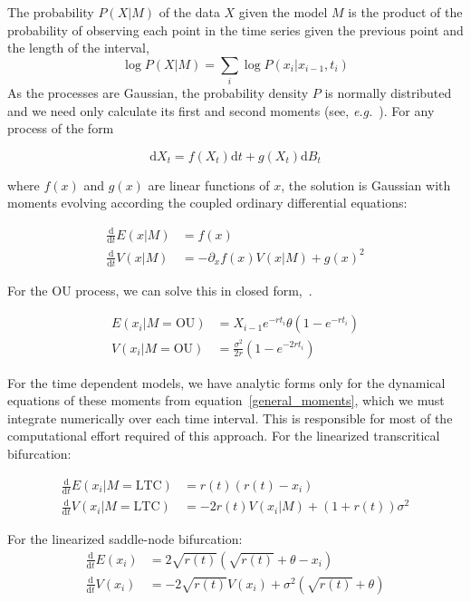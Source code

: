 \documentclass[authoryear, preprint,review,12pt]{elsarticle}
\newcommand{\ud}{\mathrm{d}}
\begin{document}
The probability $P(X|M)$ of the data $X$ given the model $M$ is the product of the probability of observing each point in the time series given the previous point and the length of the interval,  
\begin{equation}
\log P(X | M)=  \sum_i \log P(x_i | x_{i-1}, t_i)
\end{equation}
As the processes are Gaussian, the probability density $P$ is normally distributed and we need only calculate its first and second moments (see, \emph{e.g.}~\citep{Gardiner2009}). For any process of the form

\begin{equation}
  \ud X_t = f(X_t) \ud t + g(X_t) \ud B_t 
  \label{general}
\end{equation}

where $f(x)$ and $g(x)$ are linear functions of $x$, the solution is Gaussian with moments evolving according the coupled ordinary differential equations:

\begin{align}
 \frac{\ud }{\ud t} E(x| M)&=  f(x) \\
\frac{\ud}{\ud t} V(x| M) &=  -\partial_x f(x) V(x|M) + g(x)^2 
  \label{general_moments}
\end{align}

For the OU process, we can solve this in closed form,~\citep{Gardiner2009}. 


\begin{align}
  E(x_i| M = \text{OU}) &= X_{i-1} e^{-r t_i} \theta \left(1 - e^{-rt_i} \right) \\
V(x_i| M = \text{OU}) &= \frac{\sigma^2}{2 r} \left(1 - e^{-2 r t_i} \right)
\label{OUsoln}
\end{align}

For the time dependent models, we have analytic forms only for the dynamical equations of these moments from equation~\eqref{general_moments}, which we must integrate numerically over each time interval.  This is responsible for most of the computational effort required of this approach.  For the linearized transcritical bifurcation:

\begin{align}
\frac{\ud }{\ud t} E(x_i| M = \text{LTC})&=  r(t)(r(t) - x_i) \\
\frac{\ud}{\ud t} V(x_i| M = \text{LTC}) &=  -2 r(t) V(x_i|M) + (1+r(t))\sigma^2 
\label{LTCsoln}
\end{align}

For the linearized saddle-node bifurcation:
\begin{align}
\frac{\ud }{\ud t} E(x_i)&=  2\sqrt{r(t)}(\sqrt{r(t)}+\theta - x_i) \\
\frac{\ud}{\ud t} V(x_i) &=  -2 \sqrt{r(t)} V(x_i) + \sigma^2 ( \sqrt{r(t)}+\theta )
\label{LSNsoln}
\end{align}
\end{document}
